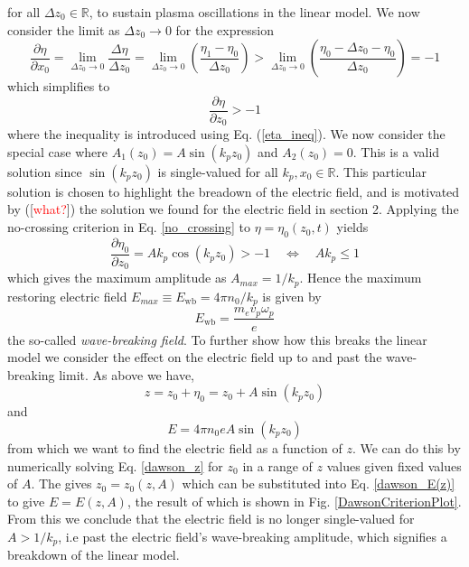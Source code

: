 for all $\Delta z_0\in \mathbb{R}$, to sustain plasma oscillations in the linear model. We now consider  the limit as $\Delta z_0\to 0$ for the expression 
\begin{equation}
\frac{\partial \eta}{\partial x_0}=\lim_{\Delta z_0\to 0}\frac{\Delta \eta}{\Delta z_0}=\lim_{\Delta z_0\to 0}\left(\frac{\eta_1-\eta_0}{\Delta z_0}\right)>\lim_{\Delta z_0\to 0}\left(\frac{\eta_0-\Delta z_0-\eta_0}{\Delta z_0}\right)=-1
\end{equation}
which simplifies to
\begin{equation}
\frac{\partial \eta}{\partial z_0}>-1
\label{no_crossing}
\end{equation}
where the inequality is introduced using Eq. (\ref{eta_ineq}). We now consider the special case where $A_1(z_0)=A\sin(k_pz_0)$ and $A_2(z_0)=0$. This is a valid solution since $\sin(k_pz_0)$ is single-valued for all $k_p,x_0\in\mathbb{R}$. This particular solution is chosen to highlight the breadown of the electric field, and is motivated by ([\textcolor{red}{what?}]) the solution we found for the electric field in section 2. Applying the no-crossing criterion in Eq. \ref{no_crossing} to $\eta=\eta_0(z_0,t)$ yields
\begin{equation}
\frac{\partial \eta_0}{\partial z_0}=Ak_p\cos(k_pz_0)>-1 \quad \Leftrightarrow \quad Ak_p\leq 1
\end{equation}
which gives the maximum amplitude as $A_{max}=1/k_p$. Hence the maximum restoring electric field $E_{max}\equiv E_{\text{wb}}=4\pi n_0/k_p$ is given by
\begin{equation}
E_{\text{wb}}=\frac{m_ev_p\omega_p}{e}
\end{equation}
the so-called \textit{wave-breaking field}. To further show how this breaks the linear model we consider the effect on the electric field up to and past the wave-breaking limit. As above we have, 
\begin{equation}
z=z_0+\eta_0=z_0+A\sin(k_p z_0)
\label{dawson_z}
\end{equation}
and 
\begin{equation}
E=4\pi n_0e A\sin(k_p z_0)
\label{dawson_E(z)}
\end{equation}
from which we want to find the electric field as a function of $z$. We can do this by numerically solving Eq. \ref{dawson_z} for $z_0$ in a range of $z$ values given fixed values of $A$. The gives $z_0=z_0(z,A)$ which can be substituted into Eq. \ref{dawson_E(z)} to give $E=E(z,A)$, the result of which is shown in Fig. \ref{DawsonCriterionPlot}. From this we conclude that the electric field is no longer single-valued for $A>1/k_p$, i.e past the electric field's wave-breaking amplitude, which signifies a breakdown of the linear model.\\
